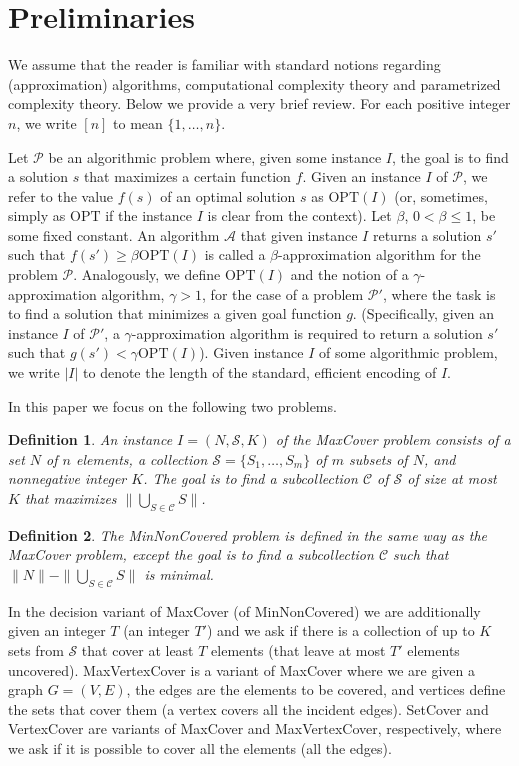 \documentclass[11pt]{article}
\newcommand{\OPT}{{{{\mathrm{OPT}}}}}
\newtheorem{definition}{Definition}
\newcommand{\calC}{{{\mathcal{C}}}}
\newcommand{\calA}{{{\mathcal{A}}}}
\newcommand{\calP}{{{\mathcal{P}}}}
\newcommand{\calS}{{{\mathcal{S}}}}
\begin{document}
\section{Preliminaries}\label{sec:prelims}

We assume that the reader is familiar with standard notions regarding
(approximation) algorithms, computational complexity theory and
parametrized complexity theory. Below we provide a very brief review.
For each positive integer $n$, we write $[n]$ to mean $\{1, \ldots,
n\}$. 

Let $\calP$ be an algorithmic problem where, given some instance $I$,
the goal is to find a solution $s$ that maximizes a certain function
$f$.  Given an instance $I$ of $\calP$, we refer to the value $f(s)$
of an optimal solution $s$ as $\OPT(I)$ (or, sometimes, simply as
$\OPT$ if the instance $I$ is clear from the context). Let $\beta$, $0
< \beta \leq 1$, be some fixed constant.  An algorithm $\calA$ that
given instance $I$ returns a solution $s'$ such that $f(s') \geq
\beta\OPT(I)$ is called a $\beta$-approximation algorithm for the
problem $\calP$.
Analogously, we define $\OPT(I)$ and the notion of a
$\gamma$-approximation algorithm, $\gamma > 1$, for the case of a
problem $\calP'$, where the task is to find a solution that minimizes
a given goal function $g$. (Specifically, given an instance $I$ of
$\calP'$, a $\gamma$-approximation algorithm is required to return a
solution $s'$ such that $g(s') < \gamma \OPT(I)$).  Given instance $I$
of some algorithmic problem, we write $|I|$ to denote the length of
the standard, efficient encoding of $I$.


In this paper we focus on the following two problems.
\begin{definition}
  An instance $I = (N,\calS,K)$ of the MaxCover problem consists of a
  set $N$ of $n$ elements, a collection $\calS = \{S_1, \ldots, S_m\}$
  of $m$ subsets of $N$, and nonnegative integer $K$. The goal is to
  find a subcollection $\calC$ of $\calS$ of size at most $K$ that
  maximizes $\|\bigcup_{S \in \calC}S\|$.
\end{definition}

\begin{definition}
  The MinNonCovered problem is defined in the same way as the MaxCover
  problem, except the goal is to find a subcollection $\calC$ such
  that $\|N\| - \|\bigcup_{S \in \calC}S\|$ is minimal.
\end{definition}
In the decision variant of MaxCover (of MinNonCovered) we are
additionally given an integer $T$ (an integer $T'$) and we ask if
there is a collection of up to $K$ sets from $\calS$ that cover at
least $T$ elements (that leave at most $T'$ elements
uncovered). MaxVertexCover is a variant of MaxCover where we are given
a graph $G = (V,E)$, the edges are the elements to be covered, and
vertices define the sets that cover them (a vertex covers all the
incident edges). SetCover and VertexCover are variants of MaxCover and
MaxVertexCover, respectively, where we ask if it is possible to cover
all the elements (all the edges).
\end{document}
